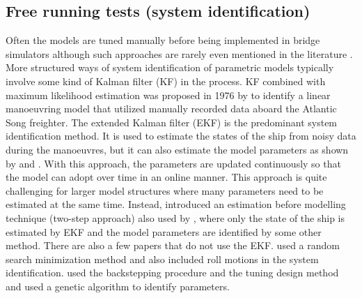 \subsection{Free running tests (system identification)} \label{sec:FT} %
Often the models are tuned manually before being implemented in bridge simulators although such approaches are rarely even mentioned in the literature \cite{sutuloAlgorithmOfflineIdentification2014}. More structured ways of system identification of parametric models typically involve some kind of Kalman filter (KF) in the process. KF combined with maximum likelihood estimation was proposed in 1976 by \textcite{astromIdentificationShipSteering1976} to identify a linear manoeuvring model that utilized manually recorded data aboard the Atlantic Song freighter. The extended Kalman filter (EKF) is the predominant system identification method. It is used to estimate the states of the ship from noisy data during the manoeuvres, but it can also estimate the model parameters as shown by \textcite{shiIdentificationShipManeuvering2009} and \textcite{pereraSystemIdentificationNonlinear2015}. With this approach, the parameters are updated continuously so that the model can adopt over time in an online manner. This approach is quite challenging for larger model structures where many parameters need to be estimated at the same time. Instead, \textcite{yoonIdentificationHydrodynamicCoefficients2003} introduced an estimation before modelling technique  (two-step approach) also used by \textcite{revestidoherreroTwostepIdentificationNonlinear2012}, where only the state of the ship is estimated by EKF and the model parameters are identified by some other method.  
There are also a few papers that do not use the EKF. \textcite{tianoMultivariableIdentificationShip1997} used a random search minimization method and also included roll motions in the system identification. \textcite{casadoIdentificationNonlinearShip2005} used the backstepping procedure and the tuning design method and \textcite{millerShipModelIdentification2021} used a genetic algorithm to identify parameters.

